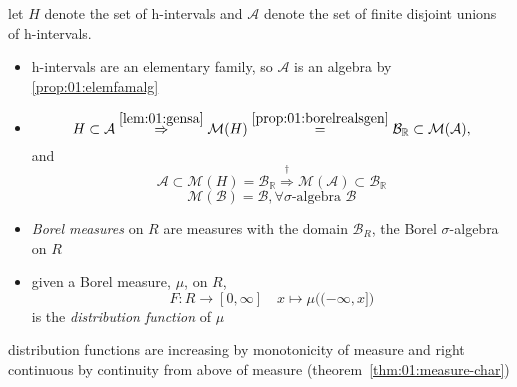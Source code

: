 \begin{rem}{}
  let $H$ denote the set of h-intervals and $\mathcal A$ denote
  the set of finite disjoint unions of h-intervals.
  \begin{itemize}
    \item
      h-intervals are an elementary family, so $\mathcal A$
      is an algebra by \ref{prop:01:elemfamalg}
    \item
      \[
      H \subset \mathcal A \stackrel{\ref{lem:01:gensa}}{\Rightarrow}
      \mathcal M(H) \stackrel{\ref{prop:01:borelrealsgen}}{=}
      \mathcal B_{\mathbb R} \subset \mathcal M(\mathcal A),
      \]
      and
      \[
      \mathcal A\subset \mathcal M(H) = \mathcal B_{\mathbb R}
      \stackrel{\dag}{\Rightarrow}
      \mathcal M(\mathcal A)\subset \mathcal B_{\mathbb R}
      \]
      \begin{equation*}
        \tag{\dag}
        \mathcal M(\mathcal B) = \mathcal B,
        \forall \sigma\text{-algebra } \mathcal B
      \end{equation*}
  \end{itemize}
\end{rem}

\begin{defn}
  \begin{itemize}
  \item
    \emph{Borel measures} on $R$ are measures with the domain
    $\mathcal B_R$, the Borel $\sigma$-algebra on $R$
  \item
    given a Borel measure, $\mu$, on $R$,
    \[F: R\rightarrow [0,\infty]\quad x\mapsto\mu\big((-\infty,x]\big)\]
      is the \emph{distribution function} of $\mu$
  \end{itemize}
\end{defn}

\begin{rem}{}
  distribution functions are increasing by monotonicity of measure
  and right continuous by continuity from above of measure
  (theorem~\ref{thm:01:measure-char})
\end{rem}

